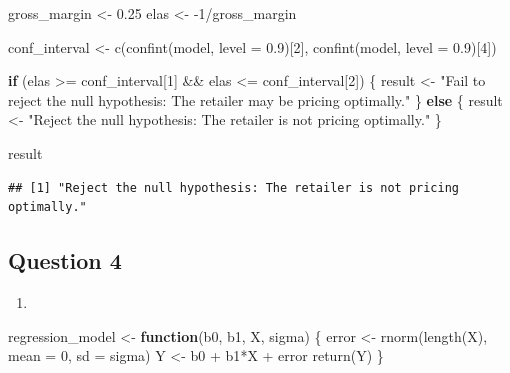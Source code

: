 \documentclass[
]{article}
\newenvironment{Shaded}{\begin{snugshade}}{\end{snugshade}}
\newcommand{\AttributeTok}[1]{\textcolor[rgb]{0.77,0.63,0.00}{#1}}
\newcommand{\ControlFlowTok}[1]{\textcolor[rgb]{0.13,0.29,0.53}{\textbf{#1}}}
\newcommand{\DecValTok}[1]{\textcolor[rgb]{0.00,0.00,0.81}{#1}}
\newcommand{\FloatTok}[1]{\textcolor[rgb]{0.00,0.00,0.81}{#1}}
\newcommand{\FunctionTok}[1]{\textcolor[rgb]{0.00,0.00,0.00}{#1}}
\newcommand{\NormalTok}[1]{#1}
\newcommand{\OtherTok}[1]{\textcolor[rgb]{0.56,0.35,0.01}{#1}}
\newcommand{\SpecialCharTok}[1]{\textcolor[rgb]{0.00,0.00,0.00}{#1}}
\newcommand{\StringTok}[1]{\textcolor[rgb]{0.31,0.60,0.02}{#1}}
\providecommand{\tightlist}{%
  \setlength{\itemsep}{0pt}\setlength{\parskip}{0pt}}
\begin{document}
\begin{Shaded}
\begin{Highlighting}[]
\NormalTok{gross\_margin }\OtherTok{\textless{}{-}} \FloatTok{0.25}
\NormalTok{elas }\OtherTok{\textless{}{-}} \SpecialCharTok{{-}}\DecValTok{1}\SpecialCharTok{/}\NormalTok{gross\_margin}

\NormalTok{conf\_interval }\OtherTok{\textless{}{-}} \FunctionTok{c}\NormalTok{(}\FunctionTok{confint}\NormalTok{(model, }\AttributeTok{level =} \FloatTok{0.9}\NormalTok{)[}\DecValTok{2}\NormalTok{], }\FunctionTok{confint}\NormalTok{(model, }\AttributeTok{level =} \FloatTok{0.9}\NormalTok{)[}\DecValTok{4}\NormalTok{])}

\ControlFlowTok{if}\NormalTok{ (elas }\SpecialCharTok{\textgreater{}=}\NormalTok{ conf\_interval[}\DecValTok{1}\NormalTok{] }\SpecialCharTok{\&\&}\NormalTok{ elas }\SpecialCharTok{\textless{}=}\NormalTok{ conf\_interval[}\DecValTok{2}\NormalTok{]) \{}
\NormalTok{  result }\OtherTok{\textless{}{-}} \StringTok{"Fail to reject the null hypothesis: The retailer may be pricing optimally."}
\NormalTok{\} }\ControlFlowTok{else}\NormalTok{ \{}
\NormalTok{  result }\OtherTok{\textless{}{-}} \StringTok{"Reject the null hypothesis: The retailer is not pricing optimally."}
\NormalTok{\}}

\NormalTok{result}
\end{Highlighting}
\end{Shaded}

\begin{verbatim}
## [1] "Reject the null hypothesis: The retailer is not pricing optimally."
\end{verbatim}

\newpage

\hypertarget{question-4}{%
\subsection{Question 4}\label{question-4}}

\begin{enumerate}
\def\labelenumi{\alph{enumi}.}
\tightlist
\item
\end{enumerate}

\begin{Shaded}
\begin{Highlighting}[]
\NormalTok{regression\_model }\OtherTok{\textless{}{-}} \ControlFlowTok{function}\NormalTok{(b0, b1, X, sigma) \{}
\NormalTok{  error }\OtherTok{\textless{}{-}} \FunctionTok{rnorm}\NormalTok{(}\FunctionTok{length}\NormalTok{(X), }\AttributeTok{mean =} \DecValTok{0}\NormalTok{, }\AttributeTok{sd =}\NormalTok{ sigma)}
\NormalTok{  Y }\OtherTok{\textless{}{-}}\NormalTok{ b0 }\SpecialCharTok{+}\NormalTok{ b1}\SpecialCharTok{*}\NormalTok{X }\SpecialCharTok{+}\NormalTok{ error}
  \FunctionTok{return}\NormalTok{(Y)}
\NormalTok{\}}
\end{Highlighting}
\end{Shaded}
\end{document}
